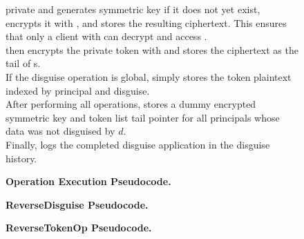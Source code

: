 \begin{figure*}
{    private and \sys generates symmetric key  if it does not yet exist, encrypts it with
    , and stores the resulting ciphertext.  This ensures that only a client with 
    can decrypt and access . \\
\sys then encrypts the private token with  and stores the ciphertext as the tail of
    s.\\
    If the disguise operation is global, \sys simply stores the token plaintext indexed by principal and
    disguise.\\
    After performing all operations, \sys stores a dummy encrypted symmetric key and token list tail pointer for all
    principals whose data was not disguised by $d$.\\
    Finally, \sys logs the completed disguise application in the disguise history.
\label{fig:appdisg}
}
\end{figure*}

\begin{figure*}
\caption{\textbf{Operation Execution Pseudocode.}}
    \label{fig:opexec}
\end{figure*}

\begin{figure*}
\caption{\textbf{ReverseDisguise Pseudocode.}}
\label{fig:revdisg}
\end{figure*}

\begin{figure*}
\caption{\textbf{ReverseTokenOp Pseudocode.}}
    \label{fig:revtoken}
\end{figure*}

